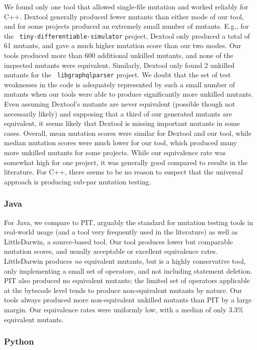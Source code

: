 \documentclass[acmsmall]{acmart}
\begin{document}
{We found only one tool that allowed single-file mutation and worked
reliably for C++.  Dextool generally produced fewer mutants than
either mode of our tool, and for some projects produced an extremely
small number of mutants.  E.g., for the {\tt
  tiny-differentiable-simulator} project, Dextool only produced a
total of 61 mutants, and gave a much higher mutation score than our
two modes.  Our tools produced more than 600 additional unkilled
mutants, and none of the inspected mutants were equivalent.
Similarly, Dextool only found 2 unkilled mutants for the {\tt
  libgraphqlparser} project.  We doubt that the set of test weaknesses
in the code is adequately represented by such a small number of
mutants when our tools were able to produce significantly more
unkilled mutants.  Even assuming Dextool's mutants are never
equivalent (possible though not necessarily likely) and supposing that a third of our
generated mutants are equivalent, it seems likely that Dextool is
missing important mutants in some cases.  Overall, mean mutation
scores were similar for Dextool and our tool, while
median mutation scores were much lower for our tool, which produced
many more unkilled mutants for some projects.  While our equivalence
rate was somewhat high for one project, it was generally good
compared to results in the literature.  For C++, there seems to
be no reason to suspect that the universal approach is producing
sub-par mutation testing.

\subsubsection{Java}

For Java, we compare to PIT, arguably the standard for mutation
testing tools in real-world usage (and a tool very frequently used in
the literature) as well as LittleDarwin, a source-based tool.  Our
tool produces lower but comparable mutation scores, and usually
acceptable or excellent equivalence rates.  LittleDarwin produces
\emph{no} equivalent mutants, but is a highly conservative tool, only
implementing a small set of operators, and not including statement
deletion.  PIT also produced no equivalent mutants; the limited set of
operators applicable at the bytecode level tends to produce
non-equivalent mutants by nature.  Our tools always produced more non-equivalent unkilled
mutants than PIT by a large margin.  Our equivalence rates were
uniformly low, with a median of only 3.3\% equivalent mutants.

\subsubsection{Python}

}
\end{document}
